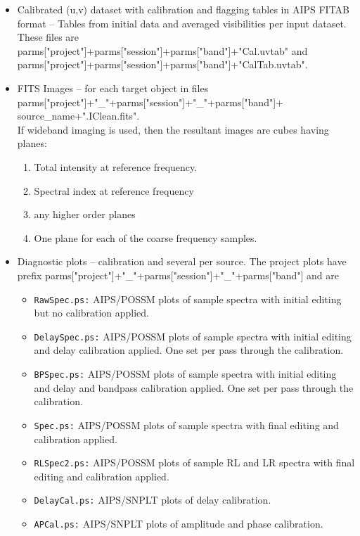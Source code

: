 \documentclass[11pt]{article}
\begin{document}
\begin{itemize}
\item Calibrated (u,v) dataset with calibration and flagging tables in
AIPS FITAB format -- Tables from initial data and averaged
visibilities per input dataset. 
These files are\\
parms["project"]+parms["session"]+parms["band"]+"Cal.uvtab"
and parms["project"]+parms["session"]+parms["band"]+"CalTab.uvtab".
\item FITS Images -- for each target object in files\\
parms["project"]+"\_"+parms["session"]+"\_"+parms["band"]+\\
source\_name+".IClean.fits".\\
If wideband imaging is used, then the resultant images are cubes
having planes:
\begin{enumerate}
\item Total intensity at reference frequency.
\item Spectral index at reference frequency
\item any higher order planes
\item One plane for each of the coarse frequency samples.
\end{enumerate}
\item Diagnostic plots -- calibration and several per source.
The project plots have prefix
parms["project"]+"\_"+parms["session"]+"\_"+parms["band"] and are
\begin{itemize}
\item{\tt RawSpec.ps:} AIPS/POSSM plots of sample spectra with initial
editing but no calibration applied.
\item{\tt DelaySpec.ps:} AIPS/POSSM plots of sample spectra with initial
editing and delay calibration applied.
One set per pass through the calibration.
\item{\tt BPSpec.ps:} AIPS/POSSM plots of sample spectra with initial
editing and delay and bandpass calibration applied.
One set per pass through the calibration.
\item{\tt Spec.ps:} AIPS/POSSM plots of sample spectra with final
editing and calibration applied.
\item{\tt RLSpec2.ps:} AIPS/POSSM plots of sample RL and LR spectra
with final editing and calibration applied.
\item{\tt DelayCal.ps:} AIPS/SNPLT plots of delay calibration.
\item{\tt APCal.ps:} AIPS/SNPLT plots of amplitude and phase calibration.
\end{itemize}

\end{itemize}
\end{document}
